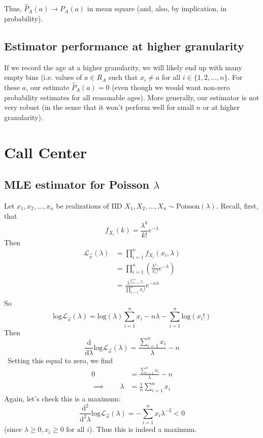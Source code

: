 \documentclass[paper=a4, fontsize=11pt]{scrartcl} %
\numberwithin{equation}{section} %
\numberwithin{figure}{section} %
\numberwithin{table}{section} %
\begin{document}
Thus, $\hat{P}_A(a) \to P_A(a)$ in mean square (and, also, by implication, in probability).

\subsection{Estimator performance at higher granularity}

If we record the age at a higher granularity, we will likely end up with many empty bins (i.e. values of $a\in R_A$ such that $x_i \ne a$ for all $i \in \{1, 2, ..., n\}$. For these $a$, our estimate $\hat{P}_A(a) = 0$ (even though we would want non-zero probability estimates for all reasonable ages). More generally, our estimator is not very robust (in the sense that it won't perform well for small $n$ or at higher granularity).



\section{Call Center}

\subsection{MLE estimator for Poisson $\lambda$}

Let $x_1, x_2, ..., x_n$ be realizations of IID $X_1, X_2, ..., X_n \sim \textrm{Poisson}(\lambda)$. Recall, first, that
\[f_{X_i}(k) = \frac{\lambda^k}{k!} e^{-\lambda}\]
Then
\begin{align*}
\mathcal{L}_{\vec{x}}(\lambda) &= \prod_{i = 1}^n f_{X_i}(x_i, \lambda) \\
   &=\prod_{i = 1}^n \left( \frac{\lambda^{x_i}}{x_i!} e^{-\lambda} \right) \\
   &=\frac{\lambda^{\sum_{i=1}^n x_i}}{\prod_{i=1}^n x_i!} e^{-n \lambda} \\
\end{align*}
So
\[\textrm{log} \mathcal{L}_{\vec{x}}(\lambda) = \textrm{log} (\lambda) \sum_{i=1}^n x_i - n \lambda - \sum_{i=1}^n \textrm{log} (x_i!)\]
Then
\[\frac{\textrm{d}}{\textrm{d}\lambda} \textrm{log} \mathcal{L}_{\vec{x}}(\lambda) = \frac{\sum_{i=1}^n x_i }{\lambda} - n\]\
Setting this equal to zero, we find
\begin{align*}
0 &= \frac{\sum_{i=1}^n x_i }{\lambda} - n \\
\implies \qquad{} \lambda &= \frac{1}{n} \sum_{i=1}^n x_i 
\end{align*}
Again, let's check this is a maximum:
\[ \frac{\textrm{d}^2}{\textrm{d}^2\lambda} \textrm{log} \mathcal{L}_{\vec{x}}(\lambda) = - \sum_{i=1}^n x_i \lambda^{-2} < 0 \]
(since $\lambda \geq 0, x_i \geq 0 \textrm{ for all } i$).
Thus this is indeed a maximum.
\end{document}
